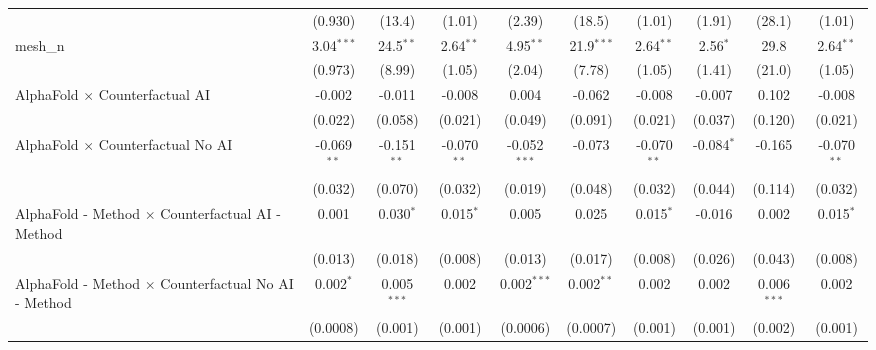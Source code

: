\begin{tabular}{lccccccccc}
                                                               & (0.930)        & (13.4)         & (1.01)         & (2.39)         & (18.5)         & (1.01)         & (1.91)         & (28.1)         & (1.01)\\   
   mesh\_n                                                     & 3.04$^{***}$   & 24.5$^{**}$    & 2.64$^{**}$    & 4.95$^{**}$    & 21.9$^{***}$   & 2.64$^{**}$    & 2.56$^{*}$     & 29.8           & 2.64$^{**}$\\   
                                                               & (0.973)        & (8.99)         & (1.05)         & (2.04)         & (7.78)         & (1.05)         & (1.41)         & (21.0)         & (1.05)\\   
   AlphaFold $\times$ Counterfactual AI                        & -0.002         & -0.011         & -0.008         & 0.004          & -0.062         & -0.008         & -0.007         & 0.102          & -0.008\\   
                                                               & (0.022)        & (0.058)        & (0.021)        & (0.049)        & (0.091)        & (0.021)        & (0.037)        & (0.120)        & (0.021)\\   
   AlphaFold $\times$ Counterfactual No AI                     & -0.069$^{**}$  & -0.151$^{**}$  & -0.070$^{**}$  & -0.052$^{***}$ & -0.073         & -0.070$^{**}$  & -0.084$^{*}$   & -0.165         & -0.070$^{**}$\\   
                                                               & (0.032)        & (0.070)        & (0.032)        & (0.019)        & (0.048)        & (0.032)        & (0.044)        & (0.114)        & (0.032)\\   
   AlphaFold - Method $\times$ Counterfactual AI - Method      & 0.001          & 0.030$^{*}$    & 0.015$^{*}$    & 0.005          & 0.025          & 0.015$^{*}$    & -0.016         & 0.002          & 0.015$^{*}$\\   
                                                               & (0.013)        & (0.018)        & (0.008)        & (0.013)        & (0.017)        & (0.008)        & (0.026)        & (0.043)        & (0.008)\\   
   AlphaFold - Method $\times$ Counterfactual No AI - Method   & 0.002$^{*}$    & 0.005$^{***}$  & 0.002          & 0.002$^{***}$  & 0.002$^{**}$   & 0.002          & 0.002          & 0.006$^{***}$  & 0.002\\   
                                                               & (0.0008)       & (0.001)        & (0.001)        & (0.0006)       & (0.0007)       & (0.001)        & (0.001)        & (0.002)        & (0.001)\\   

\end{tabular}
